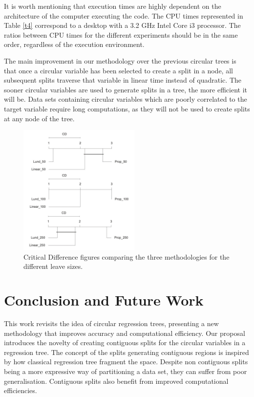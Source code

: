 \documentclass[times,twocolumn,final,authoryear]{elsarticle}
\begin{document}
It is worth mentioning that execution times are highly dependent on the architecture of the computer executing the code. The CPU times represented in Table \ref{t4} correspond to a desktop with a 3.2 GHz Intel Core i3 processor. The ratios between CPU times for the different experiments should be in the same order, regardless of the execution environment.

The main improvement in our methodology over the previous circular trees is that once a circular variable has been selected to create a split in a node, all subsequent splits traverse that variable in linear time instead of quadratic. The sooner circular variables are used to generate splits in a tree, the more efficient it will be. Data sets containing circular variables which are poorly correlated to the target variable require long computations, as they will not be used to create splits at any node of the tree.


\begin{figure}
\centering
\parbox{5cm}{
\includegraphics[width=6cm]{CD.pdf}}
\qquad
\caption{Critical Difference figures comparing the three methodologies for the different leave sizes.}
\label{f7}
\end{figure}

\section{Conclusion and Future Work}
\label{sec:5}
This work revisits the idea of circular regression trees, presenting a new methodology that improves accuracy and computational efficiency. Our proposal introduces the novelty of creating contiguous splits for the circular variables in a regression tree. The concept of the splits generating contiguous regions is inspired by how classical regression tree fragment the space. Despite non contiguous splits being a more expressive way of partitioning a data set, they can suffer from poor generalisation. Contiguous splits also benefit from improved computational efficiencies.
\end{document}
